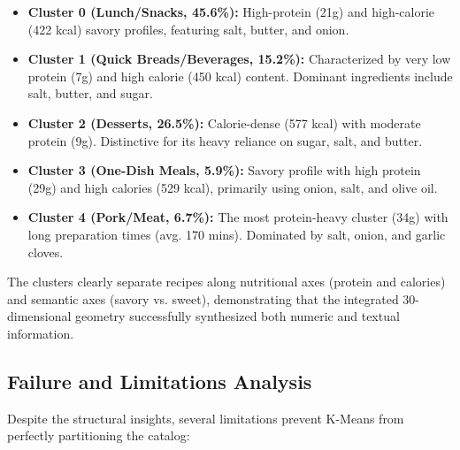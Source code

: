 \documentclass[11pt,a4paper]{article}
\begin{document}
\begin{itemize}
    \item \textbf{Cluster 0 (Lunch/Snacks, 45.6\%):} High-protein (21g) and high-calorie (422 kcal) savory profiles, featuring salt, butter, and onion.
    \item \textbf{Cluster 1 (Quick Breads/Beverages, 15.2\%):} Characterized by very low protein (7g) and high calorie (450 kcal) content. Dominant ingredients include salt, butter, and sugar.
    \item \textbf{Cluster 2 (Desserts, 26.5\%):} Calorie-dense (577 kcal) with moderate protein (9g). Distinctive for its heavy reliance on sugar, salt, and butter.
    \item \textbf{Cluster 3 (One-Dish Meals, 5.9\%):} Savory profile with high protein (29g) and high calories (529 kcal), primarily using onion, salt, and olive oil.
    \item \textbf{Cluster 4 (Pork/Meat, 6.7\%):} The most protein-heavy cluster (34g) with long preparation times (avg. 170 mins). Dominated by salt, onion, and garlic cloves.
\end{itemize}

The clusters clearly separate recipes along nutritional axes (protein and calories) and semantic axes (savory vs. sweet), demonstrating that the integrated 30-dimensional geometry successfully synthesized both numeric and textual information.

\subsection{Failure and Limitations Analysis}

Despite the structural insights, several limitations prevent K-Means from perfectly partitioning the catalog:
\end{document}
